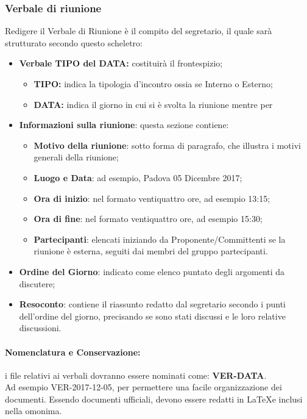 \documentclass[NormeDiProgetto.tex]{subfiles}
\begin{document}
	\subsubsection{Verbale di riunione}
	Redigere il Verbale di Riunione è il compito del segretario, il quale sarà strutturato secondo questo scheletro:
	\begin{itemize}
		\item \textbf{Verbale TIPO del DATA:} costituirà il frontespizio;
		\begin{itemize}
			\item \textbf{TIPO:} indica la tipologia d'incontro ossia se Interno o Esterno;
			\item \textbf{DATA:} indica il giorno in cui si è svolta la riunione mentre per 
		\end{itemize}
		\item \textbf{Informazioni sulla riunione}: questa sezione contiene:
		\begin{itemize}
			\item \textbf{Motivo della riunione}: sotto forma di paragrafo, che illustra i motivi generali della riunione; 
			\item \textbf{Luogo e Data}: ad esempio, Padova 05 Dicembre 2017;
			\item \textbf{Ora di inizio}: nel formato ventiquattro ore, ad esempio 13:15;
			\item \textbf{Ora di fine}: nel formato ventiquattro ore, ad esempio 15:30;
			\item \textbf{Partecipanti}: elencati iniziando da Proponente/Committenti se la riunione è esterna, seguiti dai membri del gruppo partecipanti.			\end{itemize}
			\item \textbf{Ordine del Giorno}: indicato come elenco puntato degli argomenti da discutere;
			\item \textbf{Resoconto}: contiene il riassunto redatto dal segretario secondo i punti dell'ordine del giorno, precisando se sono stati discussi e le loro relative discussioni.
	\end{itemize}
	\paragraph{Nomenclatura e Conservazione:} i file relativi ai verbali dovranno essere nominati come: \textbf{VER-DATA}.\\
	Ad esempio VER-2017-12-05, per permettere una facile organizzazione dei documenti.
	Essendo documenti ufficiali, devono essere redatti in \LaTeX e inclusi nella  omonima.
	
\end{document}
